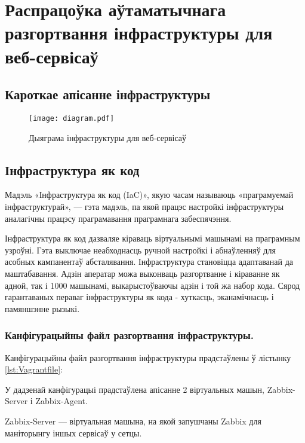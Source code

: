 \section{Распрацоўка аўтаматычнага разгортвання інфраструктуры для веб-сервісаў}

\subsection{Кароткае апісанне інфраструктуры}
\vspace{-1.5\baselineskip}
\begin{figure}[h!]
    \centering
    \texttt{[image: diagram.pdf]}
    \caption{Дыяграма інфраструктуры для веб-сервісаў}
    \label{figure:diagram} 
\end{figure}

\subsection{Інфраструктура як код}
Мадэль «Інфраструктура як код (IaC)», якую часам называюць «праграмуемай інфраструктурай», --- гэта мадэль, па якой працэс настройкі інфраструктуры аналагічны працэсу праграмавання праграмнага забеспячэння.

Інфраструктура як код дазваляе кіраваць віртуальнымі машынамі на праграмным узроўні. Гэта выключае неабходнасць ручной настройкі і абнаўленняў для асобных кампанентаў абсталявання. Інфраструктура становіцца адаптаванай да маштабавання. Адзін аператар можа выконваць разгортванне і кіраванне як адной, так і 1000 машынамі, выкарыстоўваючы адзін і той жа набор кода. Сярод гарантаваных пераваг інфраструктуры як кода - хуткасць, эканамічнасць і памяншэнне рызыкі.

\subsubsection{Канфігурацыйны файл разгортвання інфраструктуры.}
Канфігурацыйны файл разгортвання інфраструктуры прадстаўлены ў лістынку
\ref{lst:Vagrantfile}:



У дадзенай канфігурацыі прадстаўлена апісанне 2 віртуальных машын,
Zabbix-Server і Zabbix-Agent.

Zabbix-Server --- віртуальная машына, на якой запушчаны Zabbix для
маніторынгу іншых сервісаў у сетцы.

